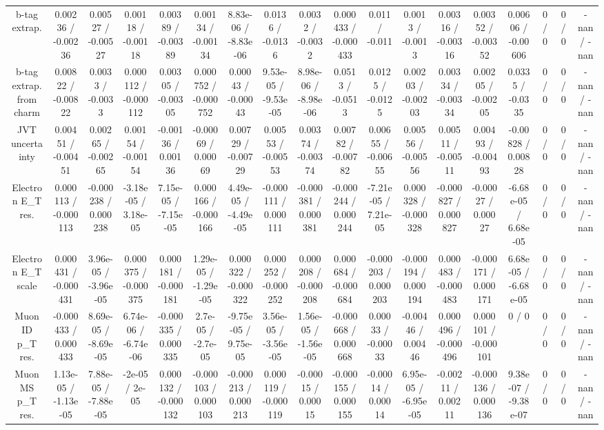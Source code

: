 \documentclass[10pt]{article}
\begin{document}
\begin{table}[htbp]
\begin{center}
\begin{tabular}{|c|c|c|c|c|c|c|c|c|c|c|c|c|c|c|c|c|c|}
  b-tag extrap. & 0.00236 / -0.00236 & 0.00527 / -0.00527 & 0.00118 / -0.00118 & 0.00389 / -0.00389 & 0.00134 / -0.00134 & 8.83e-06 / -8.83e-06 & 0.0136 / -0.0136 & 0.0032 / -0.0032 & 0.000433 / -0.000433 & 0.011 / -0.011 & 0.0013 / -0.0013 & 0.00316 / -0.00316 & 0.00352 / -0.00352 & 0.00606 / -0.00606 & 0 / 0 & 0 / 0 & -nan / -nan \\ 
  b-tag extrap. from charm & 0.00822 / -0.00822 & 0.0033 / -0.0033 & 0.000112 / -0.000112 & 0.00305 / -0.00305 & 0.000752 / -0.000752 & 0.00043 / -0.00043 & 9.53e-05 / -9.53e-05 & 8.98e-06 / -8.98e-06 & 0.0513 / -0.0513 & 0.0125 / -0.0125 & 0.00203 / -0.00203 & 0.00334 / -0.00334 & 0.00205 / -0.00205 & 0.0335 / -0.0335 & 0 / 0 & 0 / 0 & -nan / -nan \\ 
  JVT uncertainty & 0.00451 / -0.00451 & 0.00265 / -0.00265 & 0.00154 / -0.00154 & -0.00136 / 0.00136 & -0.00069 / 0.00069 & 0.00729 / -0.00729 & 0.00553 / -0.00553 & 0.00374 / -0.00374 & 0.00782 / -0.00782 & 0.00655 / -0.00655 & 0.00556 / -0.00556 & 0.00511 / -0.00511 & 0.00493 / -0.00493 & -0.00828 / 0.00828 & 0 / 0 & 0 / 0 & -nan / -nan \\ 
  Electron E_{T} res. & 0.000113 / -0.000113 & -0.000238 / 0.000238 & -3.18e-05 / 3.18e-05 & 7.15e-05 / -7.15e-05 & 0.000166 / -0.000166 & 4.49e-05 / -4.49e-05 & -0.000111 / 0.000111 & -0.000381 / 0.000381 & -0.000244 / 0.000244 & -7.21e-05 / 7.21e-05 & 0.000328 / -0.000328 & -0.000827 / 0.000827 & -0.00027 / 0.00027 & -6.68e-05 / 6.68e-05 & 0 / 0 & 0 / 0 & -nan / -nan \\ 
  Electron E_{T} scale & 0.000431 / -0.000431 & 3.96e-05 / -3.96e-05 & 0.000375 / -0.000375 & 0.000181 / -0.000181 & 1.29e-05 / -1.29e-05 & 0.000322 / -0.000322 & 0.000252 / -0.000252 & 0.000208 / -0.000208 & 0.000684 / -0.000684 & -0.000203 / 0.000203 & -0.000194 / 0.000194 & 0.000483 / -0.000483 & -0.000171 / 0.000171 & 6.68e-05 / -6.68e-05 & 0 / 0 & 0 / 0 & -nan / -nan \\ 
  Muon ID p_{T} res. & -0.000433 / 0.000433 & 8.69e-05 / -8.69e-05 & 6.74e-06 / -6.74e-06 & -0.000335 / 0.000335 & 2.7e-05 / -2.7e-05 & -9.75e-05 / 9.75e-05 & 3.56e-05 / -3.56e-05 & 1.56e-05 / -1.56e-05 & -0.000668 / 0.000668 & 0.00033 / -0.00033 & -0.00446 / 0.00446 & 0.000496 / -0.000496 & 0.000101 / -0.000101 & 0 / 0 & 0 / 0 & 0 / 0 & -nan / -nan \\ 
  Muon MS p_{T} res. & 1.13e-05 / -1.13e-05 & 7.88e-05 / -7.88e-05 & -2e-05 / 2e-05 & 0.000132 / -0.000132 & -0.000103 / 0.000103 & -0.000213 / 0.000213 & 0.000119 / -0.000119 & -0.00015 / 0.00015 & -0.000155 / 0.000155 & -0.00014 / 0.00014 & 6.95e-05 / -6.95e-05 & -0.00211 / 0.00211 & -0.000136 / 0.000136 & 9.38e-07 / -9.38e-07 & 0 / 0 & 0 / 0 & -nan / -nan \\ 

\end{tabular}
\end{center}
\end{table}
\end{document}
